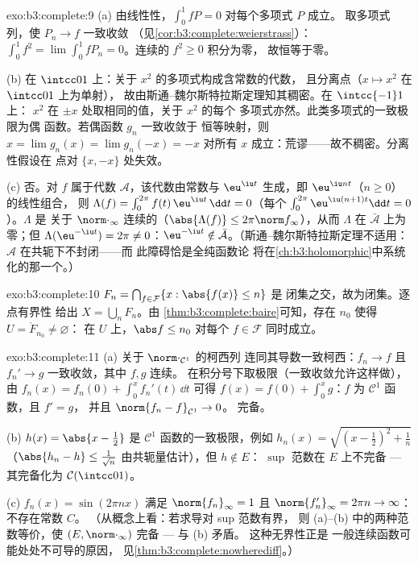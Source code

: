 \begin{solution}{exo:b3:complete:9}
(a) 由线性性，$\int_0^1 fP = 0$ 对每个多项式 $P$ 成立。
取多项式列，使 $P_n \to f$ 一致收敛
（见\cref{cor:b3:complete:weierstrass}）：$\int_0^1 f^2 =
\lim\int_0^1 fP_n = 0$。连续的 $f^2 \geq 0$ 积分为零，
故恒等于零。

(b) 在 $\intcc01$ 上：关于 $x^2$ 的多项式构成含常数的代数，
且分离点（$x \mapsto x^2$ 在 $\intcc01$ 上为单射），
故由斯通–魏尔斯特拉斯定理知其稠密。在 $\intcc{-1}1$ 上：
$x^2$ 在 $\pm x$ 处取相同的值，关于 $x^2$ 的每个
多项式亦然。此类多项式的一致极限为偶
函数。若偶函数 $g_n$ 一致收敛于
恒等映射，则 $x = \lim g_n(x) = \lim g_n(-x) = -x$ 对所有
$x$ 成立：荒谬——故不稠密。分离性假设在
点对 $\{x, -x\}$ 处失效。

(c) 否。对 $f$ 属于代数 $\mathcal A$，该代数由常数与
$\eu^{\iu t}$ 生成，即 $\eu^{\iu nt}$（$n \geq 0$）的线性组合，
则 $\Lambda(f) =
\int_0^{2\pi}f(t)\,\eu^{\iu t}\,\dd t = 0$（每个
$\int_0^{2\pi}\eu^{\iu(n+1)t}\dd t = 0$）。$\Lambda$ 是
关于 $\norm\cdot_\infty$ 连续的（$\abs{\Lambda(f)}\leq
2\pi\norm f_\infty$），从而 $\Lambda$ 在 $\bar{\mathcal
A}$ 上为零；但 $\Lambda(\eu^{-\iu t}) = 2\pi \neq 0$：$\eu^{-\iu t}
\notin \bar{\mathcal A}$。（斯通–魏尔斯特拉斯定理不适用：
$\mathcal A$ 在共轭下不封闭——而
此障碍恰是全纯函数论
将在\cref{ch:b3:holomorphic}中系统化的那一个。）
\end{solution}

\begin{solution}{exo:b3:complete:10}
$F_n = \bigcap_{f \in \mathcal F}\{x : \abs{f(x)} \leq n\}$ 是
闭集之交，故为闭集。逐点有界性
给出 $X = \bigcup_n F_n$。由
\cref{thm:b3:complete:baire}可知，存在 $n_0$ 使得 $U = \mathring F_{n_0} \neq \varnothing$：
在 $U$ 上，$\abs f \leq n_0$ 对每个 $f \in \mathcal F$
同时成立。
\end{solution}

\begin{solution}{exo:b3:complete:11}
(a) 关于 $\norm\cdot_{\mathcal C^1}$ 的柯西列
连同其导数一致柯西：$f_n \to f$
且 $f_n' \to g$ 一致收敛，其中 $f, g$ 连续。
在积分号下取极限（一致收敛允许这样做），由
$f_n(x) = f_n(0) + \int_0^xf_n'(t)\,\dd t$ 可得
$f(x) = f(0) + \int_0^xg$：$f$ 为 $\mathcal C^1$ 函数，且 $f' = g$，
并且 $\norm{f_n - f}_{\mathcal C^1} \to 0$。
完备。

(b) $h(x) = \abs{x - \frac12}$ 是
$\mathcal C^1$ 函数的一致极限，例如 $h_n(x) = \sqrt{(x -
\frac12)^2 + \frac1n}$（$\abs{h_n - h} \leq \frac1{\sqrt n}$
由共轭量估计），但 $h \notin E$：
$\sup$ 范数在 $E$ 上不完备 --- 其完备化为
$\mathcal C(\intcc01)$。

(c) $f_n(x) = \sin(2\pi nx)$ 满足 $\norm{f_n}_\infty = 1$ 且
$\norm{f_n'}_\infty = 2\pi n \to \infty$：不存在常数 $C$。
（从概念上看：若求导对 sup 范数有界，
则 (a)--(b) 中的两种范数等价，使
$(E, \norm\cdot_\infty)$ 完备 --- 与 (b) 矛盾。
这种无界性正是
一般连续函数可能处处不可导的原因，
见\cref{thm:b3:complete:nowherediff}。）
\end{solution}

